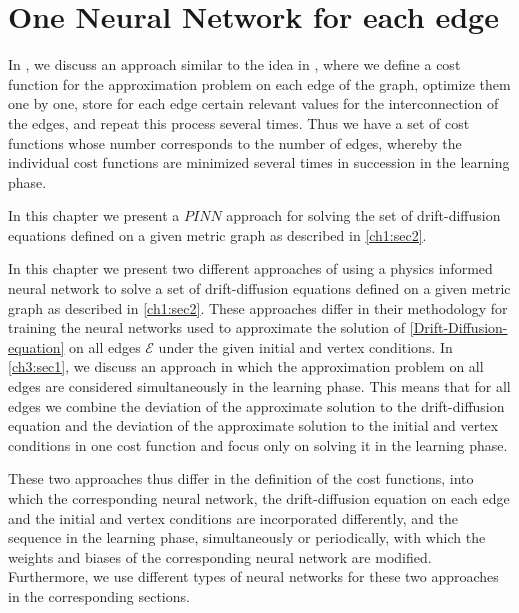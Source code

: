 \section{One Neural Network for each edge}
\label{ch3:sec2}



In , we discuss an approach similar to the idea in \cite{JagtapKharazmiKarniadakis:2020}, where we define a cost function for the approximation problem on each edge of the graph, optimize them one by one, store for each edge certain relevant values for the interconnection of the edges, and repeat this process several times. Thus we have a set of cost functions whose number corresponds to the number of edges, whereby the individual cost functions are minimized several times in succession in the learning phase. 

In this chapter we present a $PINN$ approach for solving the set of drift-diffusion equations defined on a given metric graph as described in \cref{ch1:sec2}.

In this chapter we present two different approaches of using a physics informed neural network to solve a set of drift-diffusion equations defined on a given metric graph as described in \cref{ch1:sec2}. These approaches differ in their methodology for training the neural networks used to approximate the solution of \cref{Drift-Diffusion-equation} on all edges $\mathcal{E}$ under the given initial and vertex conditions. In \cref{ch3:sec1}, we discuss an approach in which the approximation problem on all edges are considered simultaneously in the learning phase. This means that for all edges we combine the deviation of the approximate solution to the drift-diffusion equation and the deviation of the approximate solution to the initial and vertex conditions in one cost function and focus only on solving it in the learning phase. 


These two approaches thus differ in the definition of the cost functions, into which the corresponding neural network, the drift-diffusion equation on each edge and the initial and vertex conditions are incorporated differently, and the sequence in the learning phase, simultaneously or periodically, with which the weights and biases of the corresponding neural network are modified. Furthermore, we use different types of neural networks for these two approaches in the corresponding sections. 



